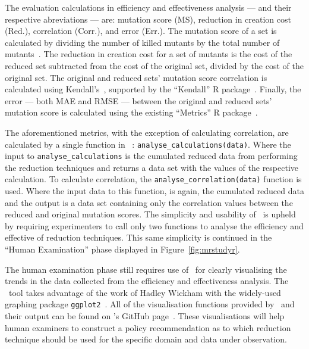 The evaluation calculations in efficiency and effectiveness analysis --- and their respective abreviations --- are: mutation score
(MS), reduction in creation cost (Red.), correlation (Corr.), and error (Err.). The mutation score of a set is calculated
by dividing the number of killed mutants by the total number of mutants~\cite{wong1995reducing}. The reduction
in creation cost for a set of mutants is the cost of the reduced set subtracted from the cost of the original set,
divided by the cost of the original set. The original and reduced sets' mutation score correlation is calculated
using Kendall's~\taub, supported by the ``Kendall'' R package~\cite{mcleod2015kendall}. Finally, the error --- both
MAE and RMSE --- between the original and reduced sets' mutation score is calculated using the existing ``Metrics''
R package~\cite{metrics}.

The aforementioned metrics, with the exception of calculating correlation, are calculated by a single function in
\mr~: \texttt{analyse\_calculations(data)}. Where the input to \texttt{analyse\_calculations} is the cumulated reduced
data from performing the reduction techniques and returns a data set with the values of the respective calculation. To
calculate correlation, the \texttt{analyse\_correlation(data)} function is used. Where the input data to this function,
is again, the cumulated reduced data and the output is a data set containing only the correlation values between the
reduced and original mutation scores. The simplicity and usability of \mr~is upheld by requiring experimenters to call
only two functions to analyse the efficiency and effective of reduction techniques. This same simplicity is continued
in the ``Human Examination'' phase displayed in Figure~\ref{fig:mrstudyr}.


The human examination phase still requires use of \mr~for clearly visualising the trends in the data collected from
the efficiency and effectiveness analysis. The \mr~tool takes advantage of the work of Hadley Wickham with the widely-used graphing package
\texttt{ggplot2}~\cite{ggplot2}. All of the visualisation functions provided by \mr~and their output can be found on
\mr's GitHub page~\cite{tool}. These visualisations will help human examiners to construct a policy recommendation as
to which reduction technique should be used for the specific domain and data under observation.


